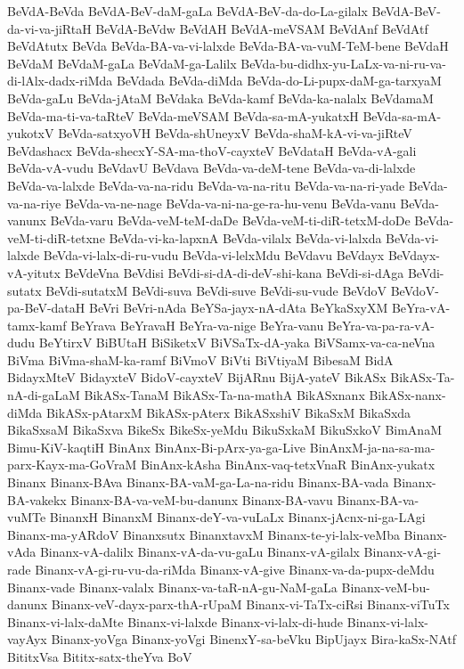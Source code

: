 {BeVdA-BeVda
BeVdA-BeV-daM-gaLa
BeVdA-BeV-da-do-La-gilalx
BeVdA-BeV-da-vi-va-jiRtaH
BeVdA-BeVdw
BeVdAH
BeVdA-meVSAM
BeVdAnf
BeVdAtf
BeVdAtutx
BeVda
BeVda-BA-va-vi-lalxde
BeVda-BA-va-vuM-TeM-bene
BeVdaH
BeVdaM
BeVdaM-gaLa
BeVdaM-ga-Lalilx
BeVda-bu-didhx-yu-LaLx-va-ni-ru-va-di-lAlx-dadx-riMda
BeVdada
BeVda-diMda
BeVda-do-Li-pupx-daM-ga-tarxyaM
BeVda-gaLu
BeVda-jAtaM
BeVdaka
BeVda-kamf
BeVda-ka-nalalx
BeVdamaM
BeVda-ma-ti-va-taRteV
BeVda-meVSAM
BeVda-sa-mA-yukatxH
BeVda-sa-mA-yukotxV
BeVda-satxyoVH
BeVda-shUneyxV
BeVda-shaM-kA-vi-va-jiRteV
BeVdashacx
BeVda-shecxY-SA-ma-thoV-cayxteV
BeVdataH
BeVda-vA-gali
BeVda-vA-vudu
BeVdavU
BeVdava
BeVda-va-deM-tene
BeVda-va-di-lalxde
BeVda-va-lalxde
BeVda-va-na-ridu
BeVda-va-na-ritu
BeVda-va-na-ri-yade
BeVda-va-na-riye
BeVda-va-ne-nage
BeVda-va-ni-na-ge-ra-hu-venu
BeVda-vanu
BeVda-vanunx
BeVda-varu
BeVda-veM-teM-daDe
BeVda-veM-ti-diR-tetxM-doDe
BeVda-veM-ti-diR-tetxne
BeVda-vi-ka-lapxnA
BeVda-vilalx
BeVda-vi-lalxda
BeVda-vi-lalxde
BeVda-vi-lalx-di-ru-vudu
BeVda-vi-lelxMdu
BeVdavu
BeVdayx
BeVdayx-vA-yitutx
BeVdeVna
BeVdisi
BeVdi-si-dA-di-deV-shi-kana
BeVdi-si-dAga
BeVdi-sutatx
BeVdi-sutatxM
BeVdi-suva
BeVdi-suve
BeVdi-su-vude
BeVdoV
BeVdoV-pa-BeV-dataH
BeVri
BeVri-nAda
BeYSa-jayx-nA-dAta
BeYkaSxyXM
BeYra-vA-tamx-kamf
BeYrava
BeYravaH
BeYra-va-nige
BeYra-vanu
BeYra-va-pa-ra-vA-dudu
BeYtirxV
BiBUtaH
BiSiketxV
BiVSaTx-dA-yaka
BiVSamx-va-ca-neVna
BiVma
BiVma-shaM-ka-ramf
BiVmoV
BiVti
BiVtiyaM
BibesaM
BidA
BidayxMteV
BidayxteV
BidoV-cayxteV
BijARnu
BijA-yateV
BikASx
BikASx-Ta-nA-di-gaLaM
BikASx-TanaM
BikASx-Ta-na-mathA
BikASxnanx
BikASx-nanx-diMda
BikASx-pAtarxM
BikASx-pAterx
BikASxshiV
BikaSxM
BikaSxda
BikaSxsaM
BikaSxva
BikeSx
BikeSx-yeMdu
BikuSxkaM
BikuSxkoV
BimAnaM
Bimu-KiV-kaqtiH
BinAnx
BinAnx-Bi-pArx-ya-ga-Live
BinAnxM-ja-na-sa-ma-parx-Kayx-ma-GoVraM
BinAnx-kAsha
BinAnx-vaq-tetxVnaR
BinAnx-yukatx
Binanx
Binanx-BAva
Binanx-BA-vaM-ga-La-na-ridu
Binanx-BA-vada
Binanx-BA-vakekx
Binanx-BA-va-veM-bu-danunx
Binanx-BA-vavu
Binanx-BA-va-vuMTe
BinanxH
BinanxM
Binanx-deY-va-vuLaLx
Binanx-jAcnx-ni-ga-LAgi
Binanx-ma-yARdoV
Binanxsutx
BinanxtavxM
Binanx-te-yi-lalx-veMba
Binanx-vAda
Binanx-vA-dalilx
Binanx-vA-da-vu-gaLu
Binanx-vA-gilalx
Binanx-vA-gi-rade
Binanx-vA-gi-ru-vu-da-riMda
Binanx-vA-give
Binanx-va-da-pupx-deMdu
Binanx-vade
Binanx-valalx
Binanx-va-taR-nA-gu-NaM-gaLa
Binanx-veM-bu-danunx
Binanx-veV-dayx-parx-thA-rUpaM
Binanx-vi-TaTx-ciRsi
Binanx-viTuTx
Binanx-vi-lalx-daMte
Binanx-vi-lalxde
Binanx-vi-lalx-di-hude
Binanx-vi-lalx-vayAyx
Binanx-yoVga
Binanx-yoVgi
BinenxY-sa-beVku
BipUjayx
Bira-kaSx-NAtf
BititxVsa
Bititx-satx-theYva
BoV
}
